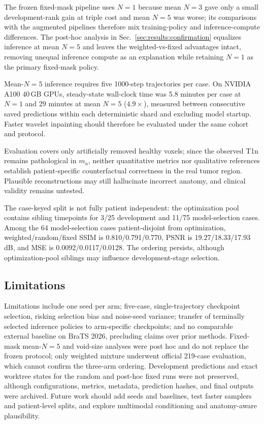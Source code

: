 \documentclass[runningheads]{llncs}
\begin{document}
The frozen fixed-mask pipeline uses $N=1$ because mean $N=3$ gave only a small development-rank gain at triple cost and mean $N=5$ was worse; its comparisons with the augmented pipelines therefore mix training-policy and inference-compute differences. The post-hoc analysis in Sec.~\ref{sec:results:confirmation} equalizes inference at mean $N=5$ and leaves the weighted-vs-fixed advantages intact, removing unequal inference compute as an explanation while retaining $N=1$ as the primary fixed-mask policy.

Mean-$N=5$ inference requires five 1000-step trajectories per case. On NVIDIA A100 40\,GB GPUs, steady-state wall-clock time was 5.8 minutes per case at $N=1$ and 29 minutes at mean $N=5$ ($4.9\times$), measured between consecutive saved predictions within each deterministic shard and excluding model startup. Faster wavelet inpainting \cite{durrer2026fastwdm3d} should therefore be evaluated under the same cohort and protocol.

Evaluation covers only artificially removed healthy voxels; since the observed T1n remains pathological in $m_u$, neither quantitative metrics nor qualitative references establish patient-specific counterfactual correctness in the real tumor region. Plausible reconstructions may still hallucinate incorrect anatomy, and clinical validity remains untested.

The case-keyed split is not fully patient independent: the optimization pool contains sibling timepoints for 3/25 development and 11/75 model-selection cases. Among the 64 model-selection cases patient-disjoint from optimization, weighted/random/fixed SSIM is 0.810/0.791/0.770, PSNR is 19.27/18.33/17.93\,dB, and MSE is 0.0092/0.0117/0.0128. The ordering persists, although optimization-pool siblings may influence development-stage selection.


\subsection{Limitations} \label{sec:discussion:limitations}

Limitations include one seed per arm; five-case, single-trajectory checkpoint selection, risking selection bias and noise-seed variance; transfer of terminally selected inference policies to arm-specific checkpoints; and no comparable external baseline on BraTS 2026, precluding claims over prior methods. Fixed-mask mean-$N=5$ and void-size analyses were post hoc and do not replace the frozen protocol; only weighted mixture underwent official 219-case evaluation, which cannot confirm the three-arm ordering. Development predictions and exact worktree states for the random and post-hoc fixed runs were not preserved, although configurations, metrics, metadata, prediction hashes, and final outputs were archived. Future work should add seeds and baselines, test faster samplers and patient-level splits, and explore multimodal conditioning and anatomy-aware plausibility.
\end{document}
